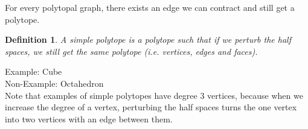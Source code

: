 \documentclass{article}
\newtheorem{definition}{Definition}
\begin{document}
\begin{theorem}
For every polytopal graph, there exists an edge we can contract and still get a polytope.
\end{theorem}
\begin{definition}
A simple polytope is a polytope such that if we perturb the half spaces, we still get the same polytope (i.e. vertices, edges and faces).
\end{definition}
Example: Cube\\
Non-Example: Octahedron \\
Note that examples of simple polytopes have degree 3 vertices, because when we increase the degree of a vertex, perturbing the half spaces turns the one vertex into two vertices with an edge between them.
\end{document}
